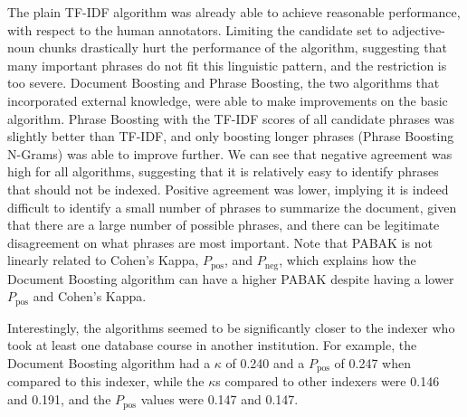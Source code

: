 The plain TF-IDF algorithm was already able to achieve reasonable
performance, with respect to the human annotators. Limiting the
candidate set to adjective-noun chunks drastically hurt the
performance of the algorithm, suggesting that many important phrases
do not fit this linguistic pattern, and the restriction is too
severe. Document Boosting and Phrase Boosting, the two algorithms that
incorporated external knowledge, were able to make improvements on the
basic algorithm. Phrase Boosting with the TF-IDF scores of all
candidate phrases was slightly better than TF-IDF, and only boosting
longer phrases (Phrase Boosting N-Grams) was able to improve
further. We can see that negative agreement was high for all
algorithms, suggesting that it is relatively easy to identify phrases
that should not be indexed. Positive agreement was lower, implying it is indeed difficult to identify a small number of phrases to summarize the document, given that there are a large number of possible phrases, and there can be legitimate disagreement on what phrases are most important. Note that PABAK is not linearly related to Cohen's Kappa, $P_{\text{pos}}$, and $P_{\text{neg}}$, which explains how the Document Boosting algorithm can have a higher PABAK despite having a lower $P_{\text{pos}}$ and Cohen's Kappa.

Interestingly, the algorithms seemed to be significantly closer to the
indexer who took at least one database course in another institution.
For example, the Document Boosting algorithm had a $\kappa$ of 0.240 and
a $P_{\text{pos}}$ of 0.247 when compared to this indexer, while the
$\kappa$s compared to other indexers were 0.146 and 0.191, and the
$P_{\text{pos}}$ values were 0.147 and 0.147.
